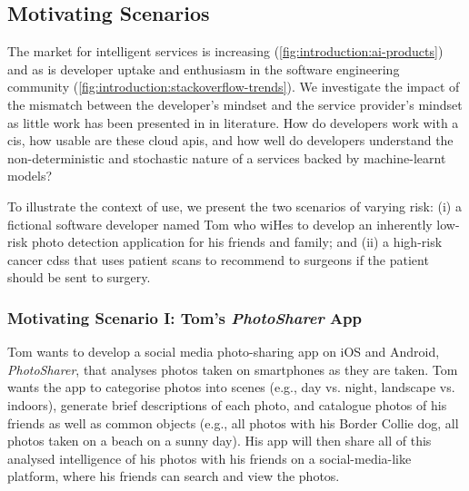 \subsection{Motivating Scenarios}
\label{ssec:introduction:motivation:scenario}

The market for intelligent services is increasing (\cref{fig:introduction:ai-products}) and as is developer uptake and enthusiasm in the software engineering community (\cref{fig:introduction:stackoverflow-trends}). We investigate the impact of the mismatch between the developer's mindset and the service provider's mindset as little work has been presented in in literature. How do developers work with a \gls{cis}, how usable are these cloud \glspl{api}, and how well do developers understand the non-deterministic and stochastic nature of a services backed by machine-learnt models? 

To illustrate the context of use, we present the two scenarios of varying risk: (i) a fictional software developer named Tom who wiHes to develop an inherently low-risk photo detection application for his friends and family; and (ii) a high-risk cancer \gls{cdss} that uses patient scans to recommend to surgeons if the patient should be sent to surgery.
  
\subsubsection{Motivating Scenario I: Tom's \textit{PhotoSharer} App}
\label{ssec:introduction:motivation:scenario:pam}

Tom wants to develop a social media photo-sharing app on iOS and Android, \textit{PhotoSharer}, that analyses photos taken on smartphones as they are taken. Tom wants the app to categorise photos into scenes (e.g., day vs. night, landscape vs. indoors), generate brief descriptions of each photo, and catalogue photos of his friends as well as common objects (e.g., all photos with his Border Collie dog, all photos taken on a beach on a sunny day). His app will then share all of this analysed intelligence of his photos with his friends on a social-media-like platform, where his friends can search and view the photos.

